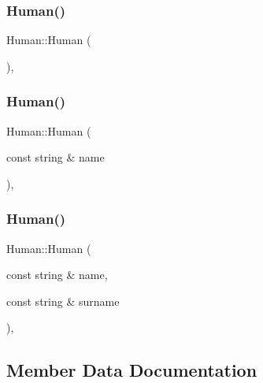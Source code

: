 \subsubsection{\texorpdfstring{Human()}{Human()}\hspace{0.1cm}{\footnotesize\ttfamily [1/3]}}
{\footnotesize\ttfamily Human\+::\+Human (\begin{DoxyParamCaption}{ }\end{DoxyParamCaption})\hspace{0.3cm}{\ttfamily [inline]}, {\ttfamily [protected]}}

\mbox{\label{class_human_abfd57b90d90f9222384c76b44346ba7b}} 
\subsubsection{\texorpdfstring{Human()}{Human()}\hspace{0.1cm}{\footnotesize\ttfamily [2/3]}}
{\footnotesize\ttfamily Human\+::\+Human (\begin{DoxyParamCaption}\item[{const string \&}]{name }\end{DoxyParamCaption})\hspace{0.3cm}{\ttfamily [inline]}, {\ttfamily [protected]}}

\mbox{\label{class_human_a87baec7c1de5375cb7e0f15050d855d3}} 
\subsubsection{\texorpdfstring{Human()}{Human()}\hspace{0.1cm}{\footnotesize\ttfamily [3/3]}}
{\footnotesize\ttfamily Human\+::\+Human (\begin{DoxyParamCaption}\item[{const string \&}]{name,  }\item[{const string \&}]{surname }\end{DoxyParamCaption})\hspace{0.3cm}{\ttfamily [inline]}, {\ttfamily [protected]}}



\subsection{Member Data Documentation}
\mbox{\label{class_human_aae88b7b47fcb48ae282483b89b753927}} 
